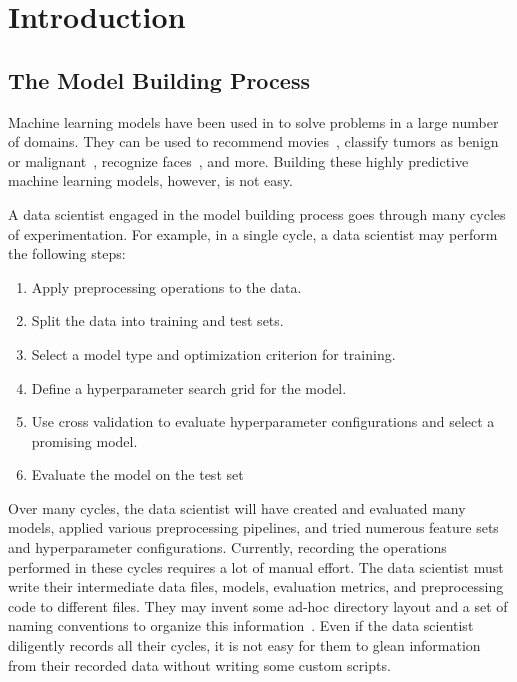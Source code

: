 \chapter{Introduction}
\section{The Model Building Process}
Machine learning models have been used in to solve problems in a large number of
domains. They can be used to recommend movies~\cite{netflixprize}, 
classify tumors as benign or malignant~\cite{tumorprediction}, recognize faces~\cite{deepface}, and more. 
Building these highly predictive machine learning models, however, is not easy. 

A data scientist engaged in the model building process goes through many cycles of
experimentation. For example, in a single cycle, a data scientist may perform the
following steps:

\begin{enumerate}
  \item Apply preprocessing operations to the data.
  \item Split the data into training and test sets.
  \item Select a model type and optimization criterion for training.
  \item Define a hyperparameter search grid for the model.
  \item Use cross validation to evaluate hyperparameter configurations and select a 
    promising model.
  \item Evaluate the model on the test set
\end{enumerate}

Over many cycles, the data scientist will have created and evaluated many models,
applied various preprocessing pipelines, and tried numerous feature sets and hyperparameter
configurations. Currently, recording the operations performed in these cycles requires
a lot of manual effort. The data scientist must write their intermediate data files, models, evaluation metrics,
and preprocessing code to different files. They may invent some ad-hoc directory layout 
and a set of naming conventions to organize this information~\cite{kaggledirectory}. Even if the data scientist
diligently records all their cycles, it is not easy for them to glean information from their
recorded data without writing some custom scripts.


